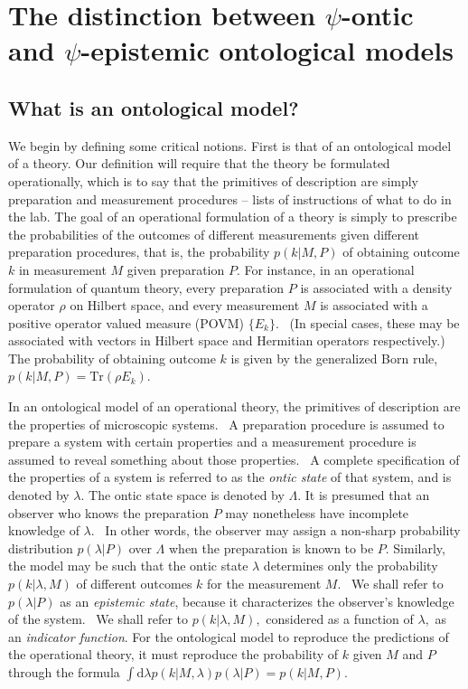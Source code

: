 \documentclass[aps,nofootinbib,12pt]{revtex4-2}
\begin{document}
\section{The distinction between $\psi$-ontic and $\psi$-epistemic ontological
models}

\subsection{What is an ontological model? \label{SEC:om_intro}}

We begin by defining some critical notions. First is that of an
ontological model of a theory. Our definition will require that the
theory be formulated operationally, which is to say that the
primitives of description are simply preparation and measurement
procedures -- lists of instructions of what to do in the lab. The
goal of an operational formulation of a theory is simply to
prescribe the probabilities of the outcomes of different
measurements given different preparation procedures, that is, the
probability $p(k|M,P)$ of obtaining outcome $k$ in measurement $M$
given preparation $P.$ For instance, in an operational formulation
of quantum theory, every preparation $P$ is associated with a
density operator $\rho$ on Hilbert space, and every measurement $M$
is associated with a positive operator valued measure (POVM)
$\{E_{k}\}$. \ (In special cases, these may be associated with
vectors in Hilbert space and Hermitian operators respectively.) The
probability of obtaining outcome $k$ is given by the generalized
Born rule, $p(k|M,P)=\mathrm{Tr}(\rho E_{k}).$

In an ontological model of an operational theory, the primitives of
description are the properties of microscopic systems. \ A
preparation procedure is assumed to prepare a system with certain
properties and a measurement procedure is assumed to reveal
something about those properties. \ A complete specification of the
properties of a system is referred to as the \emph{ontic state} of
that system, and is denoted by $\lambda$. The ontic state space is
denoted by $\Lambda$. It is presumed that an observer who knows the
preparation $P$ may nonetheless have incomplete knowledge of
$\lambda.$ \ In other words, the observer may assign a non-sharp
probability distribution $p(\lambda|P)$ over $\Lambda$ when the
preparation is known to be $P.$ Similarly, the model may be such
that the ontic state $\lambda$ determines only the probability
$p(k|\lambda,M)$ of different outcomes $k$ for the measurement $M.$
\ We shall refer to $p(\lambda|P)$ as an \emph{epistemic state},
because it characterizes the observer's knowledge of the system. \
We shall refer to $p(k|\lambda,M),$ considered as a function of
$\lambda,$ as an \emph{indicator function}. For the ontological
model to reproduce the predictions of the operational theory, it
must reproduce the probability of $k$ given $M$ and $P$ through the
formula $\int\mathrm{d}\lambda
{p}(k|M,\lambda)p(\lambda|P)=p(k|M,P).$
\end{document}
